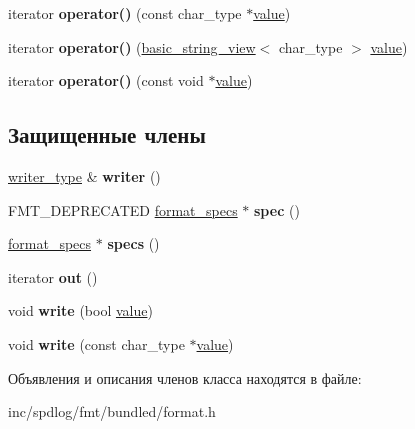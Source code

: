 \begin{DoxyCompactItemize}
iterator {\bfseries operator()} (const char\+\_\+type $\ast$\hyperlink{classinternal_1_1value}{value})
\item 
\mbox{\label{classinternal_1_1arg__formatter__base_a1699d3b1a167d32b8ac65bb81e940679}} 
iterator {\bfseries operator()} (\hyperlink{classbasic__string__view}{basic\+\_\+string\+\_\+view}$<$ char\+\_\+type $>$ \hyperlink{classinternal_1_1value}{value})
\item 
\mbox{\label{classinternal_1_1arg__formatter__base_a2584e56901804c26c7f084007f3699eb}} 
iterator {\bfseries operator()} (const void $\ast$\hyperlink{classinternal_1_1value}{value})
\end{DoxyCompactItemize}
\subsection*{Защищенные члены}
\begin{DoxyCompactItemize}
\item 
\mbox{\label{classinternal_1_1arg__formatter__base_a759de506080a0d3cc609c598557ccf41}} 
\hyperlink{classinternal_1_1basic__writer}{writer\+\_\+type} \& {\bfseries writer} ()
\item 
\mbox{\label{classinternal_1_1arg__formatter__base_ab16497a1781b854f7b04fd51704f2fe1}} 
F\+M\+T\+\_\+\+D\+E\+P\+R\+E\+C\+A\+T\+ED \hyperlink{structbasic__format__specs}{format\+\_\+specs} $\ast$ {\bfseries spec} ()
\item 
\mbox{\label{classinternal_1_1arg__formatter__base_a04811dbf9aab54fc4893851c82ba4ea4}} 
\hyperlink{structbasic__format__specs}{format\+\_\+specs} $\ast$ {\bfseries specs} ()
\item 
\mbox{\label{classinternal_1_1arg__formatter__base_aa09d371038f31903ed1eb6c69b228230}} 
iterator {\bfseries out} ()
\item 
\mbox{\label{classinternal_1_1arg__formatter__base_a3805229a1e49c6203a0d6f92e0d6ec86}} 
void {\bfseries write} (bool \hyperlink{classinternal_1_1value}{value})
\item 
\mbox{\label{classinternal_1_1arg__formatter__base_a3d38e42d3e5b5b05a9c892a1ff2fa343}} 
void {\bfseries write} (const char\+\_\+type $\ast$\hyperlink{classinternal_1_1value}{value})
\end{DoxyCompactItemize}


Объявления и описания членов класса находятся в файле\+:\begin{DoxyCompactItemize}
\item 
inc/spdlog/fmt/bundled/format.\+h\end{DoxyCompactItemize}
